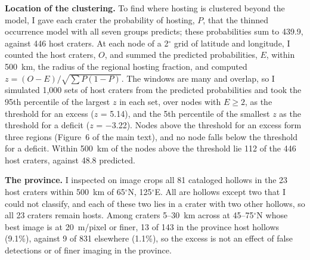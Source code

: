 \documentclass{planetary}
\begin{document}
\textbf{Location of the clustering.} To find where hosting is clustered beyond the model, I gave each crater the probability of hosting, $P$, that the thinned occurrence model with all seven groups predicts; these probabilities sum to 439.9, against 446 host craters. At each node of a 2$^\circ$ grid of latitude and longitude, I counted the host craters, $O$, and summed the predicted probabilities, $E$, within 500~km, the radius of the regional hosting fraction, and computed $z = (O - E)/\sqrt{\sum P(1 - P)}$. The windows are many and overlap, so I simulated 1,000 sets of host craters from the predicted probabilities and took the 95th percentile of the largest $z$ in each set, over nodes with $E \geq 2$, as the threshold for an excess ($z$ = 5.14), and the 5th percentile of the smallest $z$ as the threshold for a deficit ($z$ = $-$3.22). Nodes above the threshold for an excess form three regions (Figure~6 of the main text), and no node falls below the threshold for a deficit. Within 500~km of the nodes above the threshold lie 112 of the 446 host craters, against 48.8 predicted.

\textbf{The province.} I inspected on image crops all 81 cataloged hollows in the 23 host craters within 500~km of 65$^\circ$N, 125$^\circ$E. All are hollows except two that I could not classify, and each of these two lies in a crater with two other hollows, so all 23 craters remain hosts. Among craters 5--30~km across at 45--75$^\circ$N whose best image is at 20~m/pixel or finer, 13 of 143 in the province host hollows (9.1\%), against 9 of 831 elsewhere (1.1\%), so the excess is not an effect of false detections or of finer imaging in the province.
\end{document}
